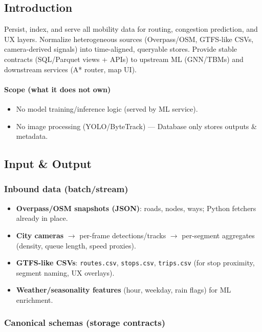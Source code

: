 \subsection{Introduction}
Persist, index, and serve all mobility data for routing, congestion prediction, and UX layers. Normalize heterogeneous sources (Overpass/OSM, GTFS-like CSVs, camera-derived signals) into time-aligned, queryable stores. Provide stable contracts (SQL/Parquet views + APIs) to upstream ML (GNN/TBMs) and downstream services (A* router, map UI).\\


\paragraph{Scope (what it does not own)}
\begin{itemize}
  \item No model training/inference logic (served by ML service).
  \item No image processing (YOLO/ByteTrack) --- Database only stores outputs \& metadata.
\end{itemize}


\subsection{Input \& Output}
\subsubsection{Inbound data (batch/stream)}
\begin{itemize}
  \item \textbf{Overpass/OSM snapshots (JSON)}: roads, nodes, ways; Python fetchers already in place.
  \item \textbf{City cameras} $\rightarrow$ per-frame detections/tracks $\rightarrow$ per-segment aggregates (density, queue length, speed proxies).
  \item \textbf{GTFS-like CSVs}: \texttt{routes.csv}, \texttt{stops.csv}, \texttt{trips.csv} (for stop proximity, segment naming, UX overlays).
  \item \textbf{Weather/seasonality features} (hour, weekday, rain flags) for ML enrichment.
\end{itemize}


\subsubsection{Canonical schemas (storage contracts)}

